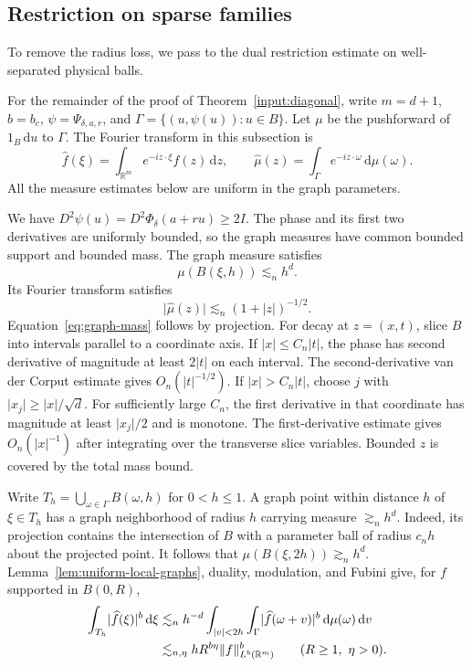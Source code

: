 \documentclass[11pt]{article}
\numberwithin{equation}{section}
\newcommand{\R}{\mathbb{R}}
\newcommand{\dd}{\,\mathrm{d}}
\newcommand{\norm}[1]{\lVert #1\rVert}
\newcommand{\abs}[1]{\lvert #1\rvert}
\begin{document}
\subsection{Restriction on sparse families}

To remove the radius loss, we pass to the dual restriction estimate
on well-separated physical balls.

For the remainder of the proof of Theorem~\ref{input:diagonal},
write \(m=d+1\), \(b=b_c\), \(\psi=\Psi_{\delta,a,r}\), and
\(\Gamma=\{(u,\psi(u)):u\in B\}\). Let \(\mu\) be the pushforward
of \(1_B\dd u\) to \(\Gamma\). The Fourier transform in this
subsection is
\[
 \widehat f(\xi)=\int_{\R^m}e^{-iz\cdot\xi}f(z)\dd z,\qquad
 \widehat\mu(z)=\int_\Gamma e^{-iz\cdot\omega}\dd\mu(\omega).
\]
All the measure estimates below are uniform in the graph parameters.

We have \(D^2\psi(u)=D^2\Phi_\delta(a+ru)\ge2I\).
The phase and its first two derivatives are uniformly bounded, so
the graph measures have common bounded support and bounded mass.
The graph measure satisfies
\begin{equation}\label{eq:graph-mass}
 \mu(B(\xi,h))\lesssim_n h^d.
\end{equation}
Its Fourier transform satisfies
\begin{equation}\label{eq:graph-mass-decay}
 \abs{\widehat\mu(z)}\lesssim_n (1+\abs z)^{-1/2}.
\end{equation}
Equation~\eqref{eq:graph-mass} follows by projection. For decay at \(z=(x,t)\),
slice \(B\) into intervals parallel to a coordinate axis.
If \(\abs x\le C_n\abs t\), the phase has second derivative of
magnitude at least \(2\abs t\) on each interval. The second-derivative
van der Corput estimate gives \(O_n(\abs t^{-1/2})\). If \(\abs x>C_n\abs t\), choose
\(j\) with \(\abs{x_j}\ge\abs x/\sqrt d\).
For sufficiently large \(C_n\), the first derivative in that coordinate
has magnitude at least \(\abs{x_j}/2\) and is monotone.
The first-derivative estimate gives \(O_n(\abs x^{-1})\) after
integrating over the transverse slice variables. Bounded \(z\) is
covered by the total mass bound.

Write \(T_h=\bigcup_{\omega\in\Gamma}B(\omega,h)\) for \(0<h\le1\).
A graph point within distance \(h\) of \(\xi\in T_h\) has a graph
neighborhood of radius \(h\) carrying measure \(\gtrsim_n h^d\).
Indeed, its projection contains the intersection of \(B\) with a
parameter ball of radius \(c_n h\) about the projected point.
It follows that \(\mu(B(\xi,2h))\gtrsim_n h^d\). Lemma~\ref{lem:uniform-local-graphs},
duality, modulation, and Fubini give, for \(f\) supported in \(B(0,R)\),
\begin{align}
 \int_{T_h}\abs{\widehat f(\xi)}^b\dd\xi
 &\lesssim_n h^{-d}
    \int_{\abs v<2h}\int_{\Gamma}
          \abs{\widehat f(\omega+v)}^b\dd\mu(\omega)\dd v
 \notag\\
 &\lesssim_{n,\eta} h R^{b\eta}\norm f_{L^b(\R^m)}^b
 \qquad (R\ge1,\ \eta>0).
 \label{eq:thin-neighborhood}
\end{align}
\end{document}
